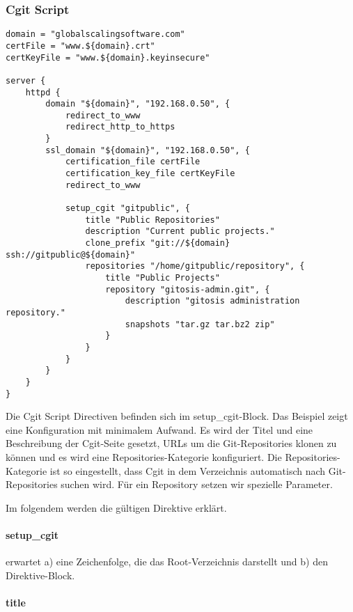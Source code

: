 \subsubsection{Cgit Script}

\begin{lstlisting}[style=Java, caption=Beispiel Cgit Script]
domain = "globalscalingsoftware.com"
certFile = "www.${domain}.crt"
certKeyFile = "www.${domain}.keyinsecure"

server {
    httpd {
        domain "${domain}", "192.168.0.50", {
            redirect_to_www
            redirect_http_to_https
        }
        ssl_domain "${domain}", "192.168.0.50", {
            certification_file certFile
            certification_key_file certKeyFile
            redirect_to_www

            setup_cgit "gitpublic", {
                title "Public Repositories"
                description "Current public projects."
                clone_prefix "git://${domain} ssh://gitpublic@${domain}"
                repositories "/home/gitpublic/repository", {
                    title "Public Projects"
                    repository "gitosis-admin.git", {
                        description "gitosis administration repository."
                        snapshots "tar.gz tar.bz2 zip"
                    }
                }
            }
        }
    }
}
\end{lstlisting}

Die Cgit Script Directiven befinden sich im setup\_cgit-Block. Das Beispiel
zeigt eine Konfiguration mit minimalem Aufwand. Es wird der Titel und eine
Beschreibung der Cgit-Seite gesetzt, URLs um die Git-Repositories klonen zu
können und es wird eine Repositories-Kategorie konfiguriert. Die
Repositories-Kategorie ist so eingestellt, dass Cgit in dem Verzeichnis
automatisch nach Git-Repositories suchen wird. Für ein Repository setzen wir
spezielle Parameter.

Im folgendem werden die gültigen Direktive erklärt.

\paragraph{setup\_cgit}

 erwartet a) eine Zeichenfolge, die das Root-Verzeichnis
darstellt und b) den Direktive-Block.

\paragraph{title}

